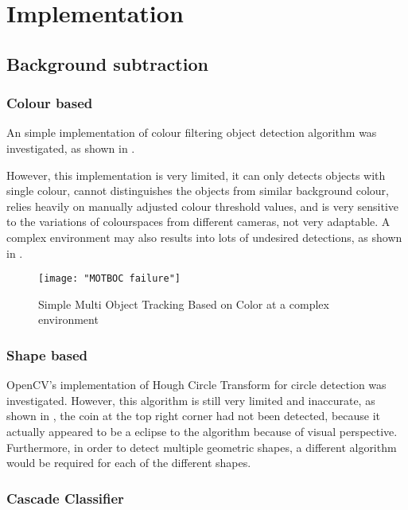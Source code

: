 \chapter{Implementation}

\section{Background subtraction}

\subsection{Colour based}

An simple implementation \cite{MOTBOC.git} of colour filtering object detection algorithm was investigated, as shown in .

However, this implementation is very limited, it can only detects objects with single colour, cannot distinguishes the objects from similar background colour, relies heavily on manually adjusted colour threshold values, and is very sensitive to the variations of colourspaces from different cameras, not very adaptable. A complex environment may also results into lots of undesired detections, as shown in .

\begin{figure}[H]
  \centering
  \texttt{[image: "MOTBOC failure"]}
  \caption{Simple Multi Object Tracking Based on Color \cite{MOTBOC.git} at a complex environment}
  \label{Figure:MOTBOC_F}
\end{figure}

\subsection{Shape based}

OpenCV's implementation of Hough Circle Transform for circle detection was investigated. However, this algorithm is still very limited and inaccurate, as shown in , the coin at the top right corner had not been detected, because it actually appeared to be a eclipse to the algorithm because of visual perspective. Furthermore, in order to detect multiple geometric shapes, a different algorithm would be required for each of the different shapes.

\subsection{Cascade Classifier}

